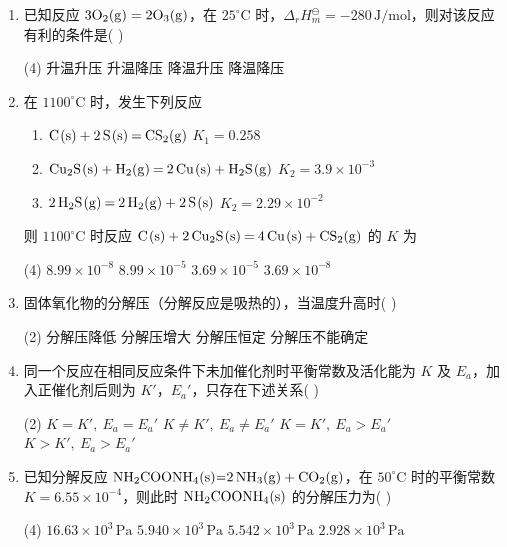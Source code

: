 \begin{enumerate}[label=\arabic*., itemsep=1.5ex]
    \item 已知反应 $3\ce{O2(g)}=2\ce{O3(g)}$，在 $25^\circ\text{C}$ 时，$\Delta_r H_m^\ominus=-280\,\mathrm{J/mol}$，则对该反应有利的条件是( )
    \begin{tasks}(4)
        \task 升温升压
        \task 升温降压
        \task 降温升压
        \task 降温降压
    \end{tasks}

    \item 在 $1100^\circ\text{C}$ 时，发生下列反应
    \begin{enumerate}
        \item $\ce{C(s) + 2S(s) = CS2(g)}$ \quad $K_1=0.258$
        \item $\ce{Cu2S(s) + H2(g) = 2Cu(s) + H2S(g)}$ \quad $K_2=3.9\times10^{-3}$
        \item $2\,\ce{H2S(g) = 2H2(g) + 2S(s)}$ \quad $K_2=2.29\times10^{-2}$
    \end{enumerate}
    则 $1100^\circ\text{C}$ 时反应 $\ce{C(s) + 2Cu2S(s) = 4Cu(s) + CS2(g)}$ 的 $K$ 为
    \begin{tasks}(4)
        \task $8.99\times10^{-8}$
        \task $8.99\times10^{-5}$
        \task $3.69\times10^{-5}$
        \task $3.69\times10^{-8}$
    \end{tasks}

    \item 固体氧化物的分解压（分解反应是吸热的），当温度升高时( )
    \begin{tasks}(2)
        \task 分解压降低
        \task 分解压增大
        \task 分解压恒定
        \task 分解压不能确定
    \end{tasks}

    \item 同一个反应在相同反应条件下未加催化剂时平衡常数及活化能为 $K$ 及 $E_a$，加入正催化剂后则为 $K'$，$E_a'$，只存在下述关系( )
    \begin{tasks}(2)
        \task $K=K',\ E_a=E_a'$
        \task $K\neq K',\ E_a\neq E_a'$
        \task $K=K',\ E_a>E_a'$
        \task $K>K',\ E_a>E_a'$
    \end{tasks}

    \item 已知分解反应 $\ce{NH2COONH4(s)=2NH3(g) + CO2(g)}$，在 $50^\circ\text{C}$ 时的平衡常数 $K=6.55\times10^{-4}$，则此时 $\ce{NH2COONH4(s)}$ 的分解压力为( )
    \begin{tasks}(4)
        \task $16.63\times10^3\,\mathrm{Pa}$
        \task $5.940\times10^3\,\mathrm{Pa}$
        \task $5.542\times10^3\,\mathrm{Pa}$
        \task $2.928\times10^3\,\mathrm{Pa}$
    \end{tasks}


\end{enumerate}
